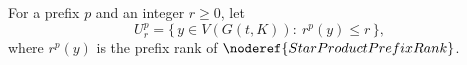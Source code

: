 \begin{definition}
For a prefix \(p\) and an integer \(r\ge0\), let
\[
  U_r^p=\{\,y\in V(G(t,K)):\ r^p(y)\le r\,\},
\]
where \(r^p(y)\) is the prefix rank of \(\noderef{StarProductPrefixRank}\).
\end{definition}
